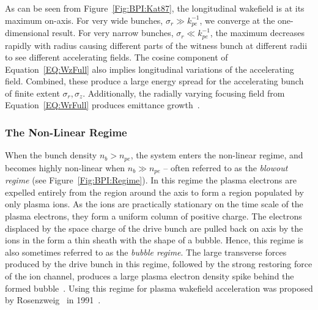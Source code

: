 As can be seen from Figure~\ref{Fig:BPI:Kat87}, the longitudinal wakefield is at its maximum on-axis.
For very wide bunches, $\sigma_{r} \gg k_{pe}^{-1}$, we converge at the one-dimensional result.
For very narrow bunches, $\sigma_{r} \ll k_{pe}^{-1}$, the maximum decreases rapidly with radius causing different parts of the witness bunch at different radii to see different accelerating fields.
The cosine component of Equation~\ref{EQ:WzFull} also implies longitudinal variations of the accelerating field.
Combined, these produce a large energy spread for the accelerating bunch of finite extent $\sigma_r, \sigma_z$.
Additionally, the radially varying focusing field from Equation~\ref{EQ:WrFull} produces emittance growth~\cite{muggli:2017,katsouleas:1987}.

\subsubsection{The Non-Linear Regime}
\label{Int:BPI:NLin}

When the bunch density $n_{b} > n_{pe}$, the system enters the non-linear regime, and becomes highly non-linear when $n_{b} \gg n_{pe}$ -- often referred to as the \textit{blowout regime} (see Figure~\ref{Fig:BPI:Regime}).
In this regime the plasma electrons are expelled entirely from the region around the axis to form a region populated by only plasma ions.
As the ions are practically stationary on the time scale of the plasma electrons, they form a uniform column of positive charge.
The electrons displaced by the space charge of the drive bunch are pulled back on axis by the ions in the form a thin sheath with the shape of a bubble.
Hence, this regime is also sometimes referred to as the \textit{bubble regime}.
The large transverse forces produced by the drive bunch in this regime, followed by the strong restoring force of the ion channel, produces a large plasma electron density spike behind the formed bubble~\cite{dawson:1959,rosenzweig:1991}.
Using this regime for plasma wakefield acceleration was proposed by Rosenzweig \etal ~in 1991~\cite{rosenzweig:1991}.

